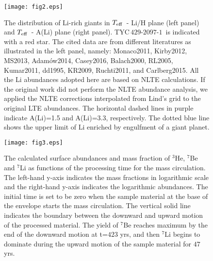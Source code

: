 \documentclass[twoside,onecolumnm,12pt]{article}
\newcommand{\upcite}[1]{\textsuperscript{\textsuperscript{\cite{#1}}}}
\newcommand{\Teff}{$T_{\rm eff}$}
\newcommand{\starname}{TYC\,$429$-$2097$-$1$}
\begin{document}
\clearpage
\small
\begin{figure}[!h]
\setlength{\abovecaptionskip}{-25pt}
\setlength{\belowcaptionskip}{-15pt}
\texttt{[image: fig2.eps]}\\
\caption{The distribution of Li-rich giants in \Teff\
- Li/H plane (left panel) and \Teff\ - A(Li) plane (right panel).
\starname\ is indicated with a red star. The cited data are from
different literatures as illustrated in the left panel, namely:
Monaco2011\upcite{Monaco2011}, Kirby2012\upcite{Kirby2012},
MS2013\upcite{Martell2013}, Adam{\'o}w2014\upcite{Adamow2014},
Casey2016\upcite{Casey2016}, Balach2000\upcite{Balachandran2000}, 
RL2005\upcite{Reddy2005}, Kumar2011\upcite{Kumar2011},
dd1995\upcite{delaReza1995}, KR2009\upcite{Kumar2009},
Ruchti2011\upcite{Ruchti2011}, and
Carlberg2015\upcite{Carlberg2015}. All the Li abundances adopted
here are based on NLTE calculations. If the original work did not
perform the NLTE abundance analysis, we applied the NLTE corrections
interpolated from Lind's grid\upcite{Lind2009} to the original LTE
abundances. The horizontal dashed lines in purple indicate A(Li)=1.5
and A(Li)=3.3, respectively. The dotted blue line
shows the upper limit of Li enriched by engulfment
of a giant planet\upcite{Aguilera2016}.}\label{fig2}
\end{figure}

\clearpage
\small
\begin{figure}[!t]
\setlength{\abovecaptionskip}{-15pt}
\setlength{\belowcaptionskip}{-15pt}
\texttt{[image: fig3.eps]}\\
\caption{The calculated surface abundances and mass
fraction of $^3$He, $^7$Be and $^7$Li as functions of the processing
time for the mass circulation. The left-hand y-axis
indicates the mass fractions in logarithmic scale and the right-hand
y-axis indicates the logarithmic abundances. The initial time is
set to be zero when the sample material at the base of the envelope
starts the mass circulation. The vertical solid line indicates the
boundary between the downward and upward motion of the processed
material. The yield of $^7$Be reaches maximum by
the end of the downward motion at t=$423$ yrs, and then $^7$Li 
begins to dominate during the upward motion of the
sample material for $47$ yrs. }\label{fig3}
\end{figure}




\clearpage
\appendix
\end{document}
